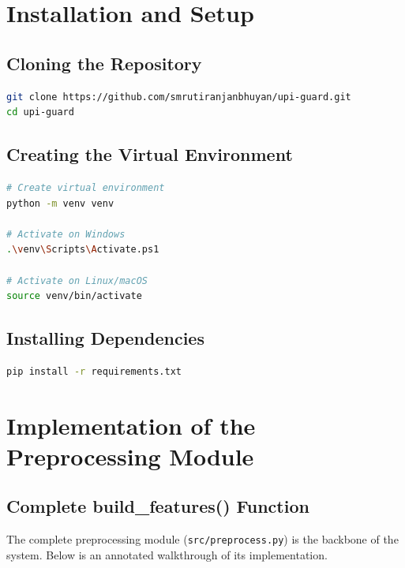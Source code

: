 \section{Installation and Setup}

\subsection{Cloning the Repository}

\begin{lstlisting}[language=bash, caption={Repository setup commands}]
git clone https://github.com/smrutiranjanbhuyan/upi-guard.git
cd upi-guard
\end{lstlisting}

\subsection{Creating the Virtual Environment}

\begin{lstlisting}[language=bash, caption={Virtual environment setup}]
# Create virtual environment
python -m venv venv

# Activate on Windows
.\venv\Scripts\Activate.ps1

# Activate on Linux/macOS
source venv/bin/activate
\end{lstlisting}

\subsection{Installing Dependencies}

\begin{lstlisting}[language=bash, caption={Installing project dependencies}]
pip install -r requirements.txt
\end{lstlisting}

\section{Implementation of the Preprocessing Module}

\subsection{Complete build\_features() Function}

The complete preprocessing module (\texttt{src/preprocess.py}) is the backbone of the system. Below is an annotated walkthrough of its implementation.

